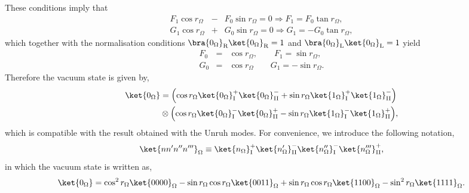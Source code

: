 These conditions imply that
\begin{eqnarray}
F_1\cos r_{\Omega}&-&F_0\sin r_{\Omega}=0\Rightarrow F_1=F_0\tan r_{\Omega},\nonumber \\
G_1\cos r_{\Omega}&+&G_0\sin r_{\Omega}=0\Rightarrow G_1=-G_0\tan r_{\Omega},
\end{eqnarray}
which together with the normalisation conditions $\bra{0_\Omega}_\text{\text{R}}\ket{0_\Omega}_\text{\text{R}}=1$ and $\bra{0_\Omega}_\text{\text{L}}\ket{0_\Omega}_\text{\text{L}}=1$ yield
\begin{eqnarray}
F_0&=&\cos r_{\Omega},\qquad F_1=\sin r_{\Omega},\\
G_0&=&\cos r_{\Omega}\qquad G_1=-\sin r_{\Omega}.\nonumber
\end{eqnarray}
Therefore  the vacuum state is given by,
 \begin{align}\label{vacgrassman} 
\nonumber\ket{0_{\Omega}}&=\left(\cos r_{\Omega}\ket{0_{\Omega}}^+_\text{I}\ket{0_{\Omega}}^-_\text{II}+\sin r_{\Omega}\ket{1_{\Omega}}^+_\text{I}\ket{1_{\Omega}}^-_\text{II}\right)\\
&\otimes\left(\cos r_{\Omega}\ket{0_{\Omega}}^-_\text{I}\ket{0_{\Omega}}^+_\text{II}-\sin r_{\Omega}\ket{1_{\Omega}}^-_\text{I}\ket{1_{\Omega}}^+_\text{II}\right)\!,
\end{align}
which is compatible with the result obtained with the Unruh modes. For convenience, we introduce the following notation, \begin{equation}\label{shortnot}
\ket{n n' n'' n'''}_{\Omega}\equiv\ket{n_{\Omega}}^+_\text{I}\ket{n'_{\Omega}}^-_\text{II}\ket{n''_{\Omega}}^-_\text{I}\ket{n'''_{\Omega}}^+_\text{II},
\end{equation}
in which the vacuum state is written as,
\begin{equation}\label{shortvac}
\ket{0_{\Omega}}=\cos^2 r_{\Omega}\ket{0000}_{\Omega}-\sin r_{\Omega}\cos r_{\Omega}\ket{0011}_{\Omega}+\sin r_{\Omega}\cos r_{\Omega} \ket{1100}_{\Omega}-\sin^2 r_{\Omega} \ket{1111}_{\Omega}.
\end{equation}


